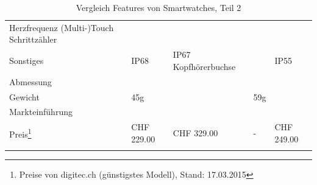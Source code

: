\begin{landscape}
\begin{longtable}{p{3cm}p{4cm}p{4cm}p{4cm}p{4cm}p{4cm}}
			Herzfrequenz \newline
			(Multi-)Touch \newline
			Schrittzähler \\
	Sonstiges
		&
		& IP68
		& IP67 \newline
			Kopfhörerbuchse
		&
		& IP55\\
	Abmessung
		\\
	Gewicht
		&
		& 45g
		&
		& 59g
		& \\ 
	Markteinführung
		\\
	Preis\footnote{Preise von digitec.ch (günstigstes Modell), Stand: 17.03.2015}
		&		
		& CHF 229.00
		& CHF 329.00
		& -
		& CHF 249.00\\
	\hline
	\caption{Vergleich Features von Smartwatches, Teil 2} \\
	
\end{longtable}
\end{landscape}
